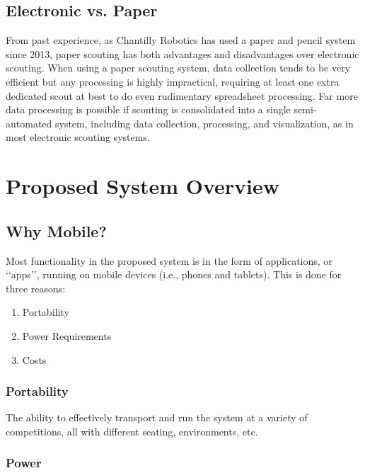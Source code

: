 \documentclass[11pt]{report}
\begin{document}
\subsection{Electronic vs. Paper}

From past experience, as Chantilly Robotics has used a paper and pencil system since 2013, paper scouting has both advantages and disadvantages over electronic scouting. When using a paper scouting system, data collection tends to be very efficient but any processing is highly impractical, requiring at least one extra dedicated scout at best to do even rudimentary spreadsheet processing. Far more data processing is possible if scouting is consolidated into a single semi-automated system, including data collection, processing, and visualization, as in most electronic scouting systems.


\section{Proposed System Overview}

\subsection{Why Mobile?}

Most functionality in the proposed system is in the form of applications, or \lq\lq{apps}\rq\rq{}, running on mobile devices (i.e., phones and tablets). This is done for three reasons:

\begin{enumerate}
\item Portability
\item Power Requirements
\item Costs
\end{enumerate}

\subsubsection*{Portability}

The ability to effectively transport and run the system at a variety of competitions, all with different seating, environments, etc.

\subsubsection*{Power}
\end{document}

